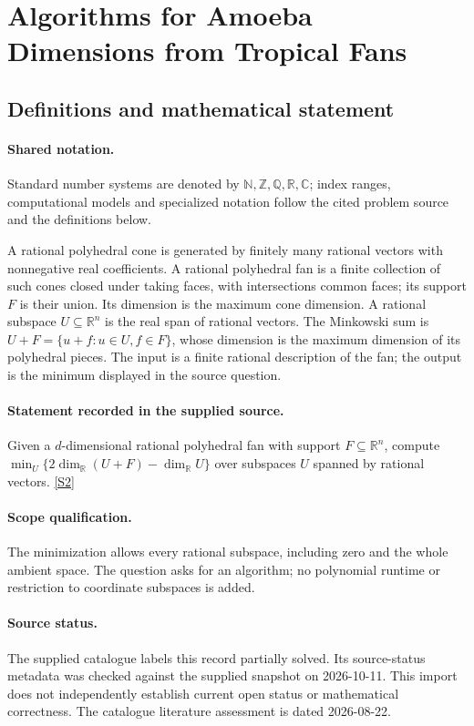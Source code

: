 \documentclass[11pt]{article}
\newcommand{\sref}[2]{\hyperlink{source:#1:#2}{[S#2]}}
\begin{document}
\section{Algorithms for Amoeba Dimensions from Tropical Fans}\label{statement}

\subsection{Definitions and mathematical statement}

\paragraph{Shared notation.}Standard number systems are denoted by $\mathbb N,\mathbb Z,\mathbb Q,\mathbb R,\mathbb C$; index ranges, computational models and specialized notation follow the cited problem source and the definitions below.


A rational polyhedral cone is generated by finitely many rational vectors with nonnegative real coefficients. A rational polyhedral fan is a finite collection of such cones closed under taking faces, with intersections common faces; its support $F$ is their union. Its dimension is the maximum cone dimension. A rational subspace $U\subseteq\mathbb R^n$ is the real span of rational vectors. The Minkowski sum is $U+F=\{u+f:u\in U,f\in F\}$, whose dimension is the maximum dimension of its polyhedral pieces. The input is a finite rational description of the fan; the output is the minimum displayed in the source question.
\paragraph{Statement recorded in the supplied source.}
Given a $d$-dimensional rational polyhedral fan with support $F\subseteq\mathbb R^n$, compute $\min_U\{2\dim_{\mathbb R}(U+F)-\dim_{\mathbb R}U\}$ over subspaces $U$ spanned by rational vectors. \sref{statement}{2}
\paragraph{Scope qualification.}
The minimization allows every rational subspace, including zero and the whole ambient space. The question asks for an algorithm; no polynomial runtime or restriction to coordinate subspaces is added.
\paragraph{Source status.}
The supplied catalogue labels this record partially solved. Its source-status metadata was checked against the supplied snapshot on 2026-10-11. This import does not independently establish current open status or mathematical correctness. The catalogue literature assessment is dated 2026-08-22.
\end{document}
